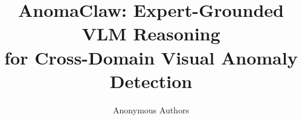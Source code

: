 \documentclass{article}
\title{AnomaClaw: Expert-Grounded VLM Reasoning \\ for Cross-Domain Visual Anomaly Detection}
\author{Anonymous Authors}
\theoremstyle{plain}
\theoremstyle{definition}
\theoremstyle{remark}
\begin{document}
\maketitle

\begin{abstract}

\end{abstract}










\newpage
\appendix

\end{document}
